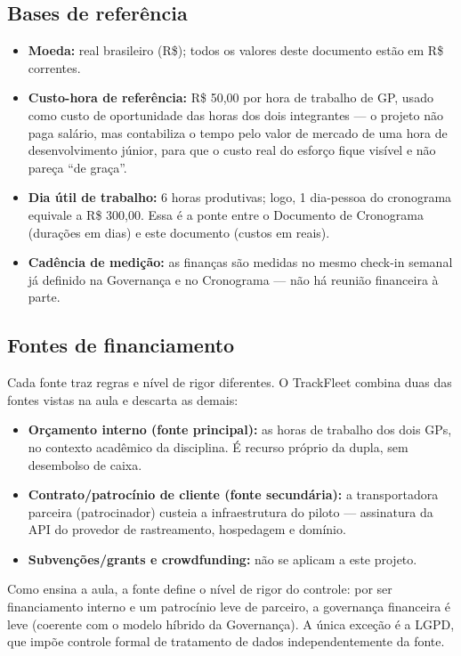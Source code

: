 \documentclass[11pt,a4paper]{article}
\begin{document}
\subsection{Bases de referência}
\begin{itemize}[itemsep=3pt]
  \item \textbf{Moeda:} real brasileiro (R\$); todos os valores deste documento estão em R\$ correntes.
  \item \textbf{Custo-hora de referência:} R\$ 50,00 por hora de trabalho de GP, usado como custo de oportunidade das horas dos dois integrantes --- o projeto não paga salário, mas contabiliza o tempo pelo valor de mercado de uma hora de desenvolvimento júnior, para que o custo real do esforço fique visível e não pareça ``de graça''.
  \item \textbf{Dia útil de trabalho:} 6 horas produtivas; logo, 1 dia-pessoa do cronograma equivale a R\$ 300,00. Essa é a ponte entre o Documento de Cronograma (durações em dias) e este documento (custos em reais).
  \item \textbf{Cadência de medição:} as finanças são medidas no mesmo check-in semanal já definido na Governança e no Cronograma --- não há reunião financeira à parte.
\end{itemize}

\subsection{Fontes de financiamento}
Cada fonte traz regras e nível de rigor diferentes. O TrackFleet combina duas das fontes vistas na aula e descarta as demais:
\begin{itemize}[itemsep=2pt]
  \item \textbf{Orçamento interno (fonte principal):} as horas de trabalho dos dois GPs, no contexto acadêmico da disciplina. É recurso próprio da dupla, sem desembolso de caixa.
  \item \textbf{Contrato/patrocínio de cliente (fonte secundária):} a transportadora parceira (patrocinador) custeia a infraestrutura do piloto --- assinatura da API do provedor de rastreamento, hospedagem e domínio.
  \item \textbf{Subvenções/grants e crowdfunding:} não se aplicam a este projeto.
\end{itemize}
\noindent Como ensina a aula, a fonte define o nível de rigor do controle: por ser financiamento interno e um patrocínio leve de parceiro, a governança financeira é leve (coerente com o modelo híbrido da Governança). A única exceção é a LGPD, que impõe controle formal de tratamento de dados independentemente da fonte.
\end{document}
